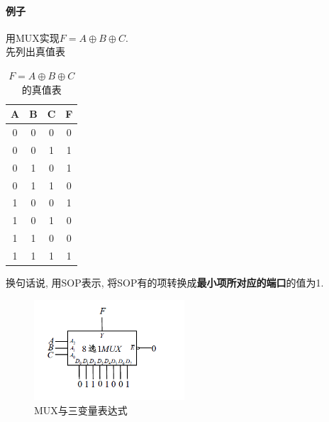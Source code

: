 \documentclass[scheme=chinese,a4paper]{report}
\begin{document}
\paragraph{例子} 用MUX实现$F=A\oplus B\oplus C$. \\
\label{eg:mux_1}
先列出真值表
\begin{table}[H]
    \centering
    \caption{$F=A\oplus B\oplus C$的真值表}
      \begin{tabular}{ccc|c}
      A     & B     & C     & F \\
      \hline
      0     & 0     & 0     & 0 \\
      0     & 0     & 1     & 1 \\
      0     & 1     & 0     & 1 \\
      0     & 1     & 1     & 0 \\
      1     & 0     & 0     & 1 \\
      1     & 0     & 1     & 0 \\
      1     & 1     & 0     & 0 \\
      1     & 1     & 1     & 1 \\
      \end{tabular}%
  \end{table}%
换句话说, 用SOP表示, 将SOP有的项转换成\textbf{最小项所对应的端口}的值为1. 
\begin{figure}[H]
\centering
\includegraphics[width=0.5\textwidth]{mux_1.png}
\caption{MUX与三变量表达式}
\end{figure}
\end{document}
